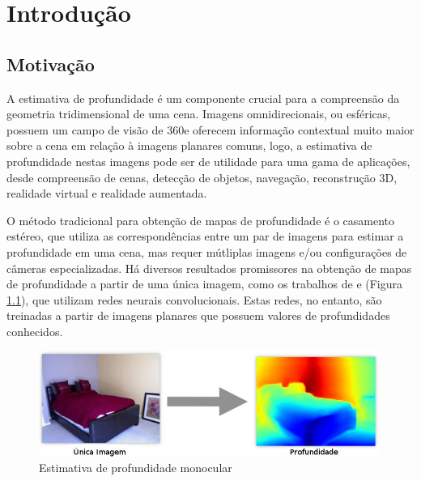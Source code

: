 \documentclass[cic,tc]{iiufrgs}
\begin{document}
\tableofcontents


\chapter{Introdução}

\section{Motivação}

A estimativa de profundidade é um componente crucial para a compreensão da geometria tridimensional de uma cena. Imagens omnidirecionais, ou esféricas, possuem um campo de visão de 360\degree e oferecem informação contextual muito maior sobre a cena em relação à imagens planares comuns, logo, a estimativa de profundidade nestas imagens pode ser de utilidade para uma gama de aplicações, desde compreensão de cenas, detecção de objetos, navegação, reconstrução 3D, realidade virtual e realidade aumentada.

O método tradicional para obtenção de mapas de profundidade é o casamento estéreo, que utiliza as correspondências entre um par de imagens para estimar a profundidade em uma cena, mas requer mútliplas imagens e/ou configurações de câmeras especializadas. Há diversos resultados promissores na obtenção de mapas de profundidade a partir de uma única imagem, como os trabalhos de  \citet{Eigen2015} e \citet{Fayao2015} (Figura \ref{fig:monoDepth}), que utilizam redes neurais convolucionais. Estas redes, no entanto, são treinadas a partir de imagens planares que possuem valores de profundidades conhecidos.

\begin{figure}
    \caption{Estimativa de profundidade monocular}
    \begin{center}
        \includegraphics[width=30em]{monocular-depth.jpg}
    \end{center}
    \label{fig:monoDepth}
\end{figure}
\end{document}

